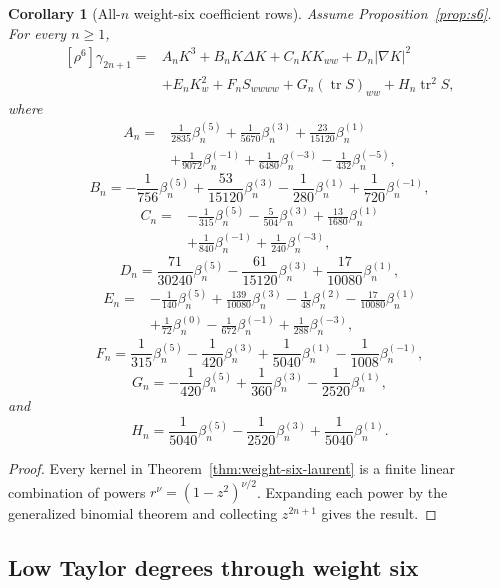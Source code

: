 \documentclass[11pt]{article}
\newtheorem{corollary}[theorem]{Corollary}
\theoremstyle{definition}
\theoremstyle{remark}
\newcommand{\tr}{\operatorname{tr}}
\begin{document}
\begin{corollary}[All-\(n\) weight-six coefficient rows]
\label{cor:all-n}
Assume Proposition~\ref{prop:s6}.  For every \(n\ge1\),
\[
\begin{aligned}
[\rho^6]\gamma_{2n+1}
={}&
A_nK^3+B_nK\Delta K+C_nKK_{ww}+D_n|\nabla K|^2
\\
&+E_nK_w^2+F_nS_{wwww}+G_n(\tr S)_{ww}+H_n\tr^2S,
\end{aligned}
\]
where
\[
\begin{aligned}
A_n={}&
\frac1{2835}\beta_n^{(5)}
+\frac1{5670}\beta_n^{(3)}
+\frac{23}{15120}\beta_n^{(1)}
\\
&+\frac1{9072}\beta_n^{(-1)}
+\frac1{6480}\beta_n^{(-3)}
-\frac1{432}\beta_n^{(-5)},
\end{aligned}
\]
\[
B_n
=
-\frac1{756}\beta_n^{(5)}
+\frac{53}{15120}\beta_n^{(3)}
-\frac1{280}\beta_n^{(1)}
+\frac1{720}\beta_n^{(-1)},
\]
\[
\begin{aligned}
C_n={}&
-\frac1{315}\beta_n^{(5)}
-\frac5{504}\beta_n^{(3)}
+\frac{13}{1680}\beta_n^{(1)}
\\
&+\frac1{840}\beta_n^{(-1)}
+\frac1{240}\beta_n^{(-3)},
\end{aligned}
\]
\[
D_n
=
\frac{71}{30240}\beta_n^{(5)}
-\frac{61}{15120}\beta_n^{(3)}
+\frac{17}{10080}\beta_n^{(1)},
\]
\[
\begin{aligned}
E_n={}&
-\frac1{140}\beta_n^{(5)}
+\frac{139}{10080}\beta_n^{(3)}
-\frac1{48}\beta_n^{(2)}
-\frac{17}{10080}\beta_n^{(1)}
\\
&+\frac1{72}\beta_n^{(0)}
-\frac1{672}\beta_n^{(-1)}
+\frac1{288}\beta_n^{(-3)},
\end{aligned}
\]
\[
F_n
=
\frac1{315}\beta_n^{(5)}
-\frac1{420}\beta_n^{(3)}
+\frac1{5040}\beta_n^{(1)}
-\frac1{1008}\beta_n^{(-1)},
\]
\[
G_n
=
-\frac1{420}\beta_n^{(5)}
+\frac1{360}\beta_n^{(3)}
-\frac1{2520}\beta_n^{(1)},
\]
and
\[
H_n
=
\frac1{5040}\beta_n^{(5)}
-\frac1{2520}\beta_n^{(3)}
+\frac1{5040}\beta_n^{(1)}.
\]
\end{corollary}

\begin{proof}
Every kernel in Theorem~\ref{thm:weight-six-laurent} is a finite linear
combination of powers \(r^\nu=(1-z^2)^{\nu/2}\).  Expanding each power by the
generalized binomial theorem and collecting \(z^{2n+1}\) gives the result.
\end{proof}

\subsection{Low Taylor degrees through weight six}
\end{document}
